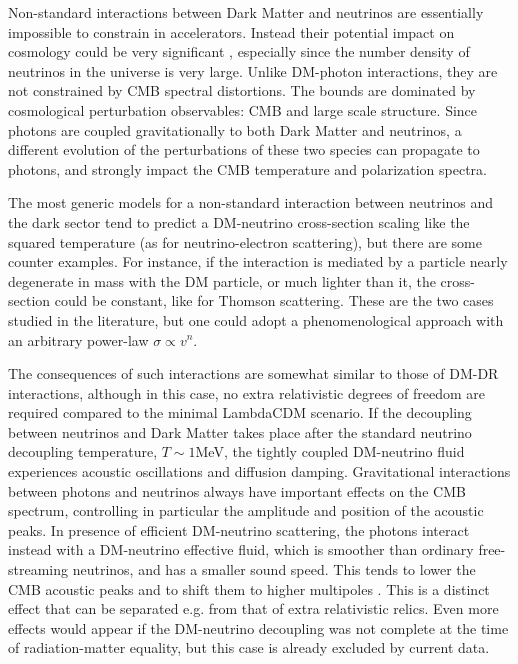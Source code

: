 \documentclass[12pt]{article}
\begin{document}
Non-standard interactions between Dark Matter and neutrinos are essentially impossible to constrain in accelerators. 
Instead their potential impact on cosmology could be very significant \cite{Boehm:2001hm,Mangano:2006mp,Serra:2009uu,Wilkinson:2014ksa}, especially since the number density of neutrinos in the universe is very large. Unlike DM-photon interactions, they are not constrained by CMB spectral distortions. The bounds are dominated by cosmological perturbation observables: CMB and large scale structure. Since photons are coupled gravitationally to both Dark Matter and neutrinos, a different evolution of the perturbations of these two species can propagate to photons, and strongly impact the CMB temperature and polarization spectra.

The most generic models for a non-standard interaction between neutrinos and the dark sector tend to predict a DM-neutrino cross-section scaling like the squared temperature (as for neutrino-electron scattering), but there are some counter examples. For instance, if the interaction is mediated by a particle nearly degenerate in mass with the DM particle, or much lighter than it, the cross-section could be constant, like for Thomson scattering. These are the two cases studied in the literature, but one could adopt a phenomenological approach with an arbitrary power-law $\sigma \propto v^n$.

The consequences of such interactions are somewhat similar to those of DM-DR interactions, although in this case, no extra relativistic degrees of freedom are required compared to the minimal LambdaCDM scenario. If the decoupling between neutrinos and Dark Matter takes place after the standard neutrino decoupling temperature, $T \sim 1$MeV, the tightly coupled DM-neutrino fluid experiences acoustic oscillations and diffusion damping. Gravitational interactions between photons and neutrinos always have important effects on the CMB spectrum, controlling in  particular the amplitude and position of the acoustic peaks. In presence of efficient DM-neutrino scattering, the photons interact instead with a DM-neutrino effective fluid, which is smoother than ordinary free-streaming neutrinos, and has a smaller sound speed. This tends to lower the CMB acoustic peaks and to shift them to higher multipoles \cite{Wilkinson:2014ksa}. This is a distinct effect that can be separated e.g. from that of extra relativistic relics. Even more effects would appear if the DM-neutrino decoupling was not complete at the time of radiation-matter equality, but this case is already excluded by current data. 
\end{document}
